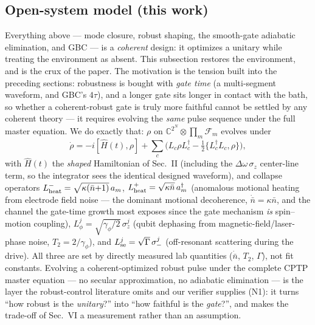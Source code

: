 \documentclass[aps,prapplied,twocolumn,superscriptaddress,floatfix,nofootinbib]{revtex4-2}
\begin{document}
\subsection{Open-system model (this work)}
Everything above --- mode closure, robust shaping, the smooth-gate adiabatic elimination, and GBC
--- is a \emph{coherent} design: it optimizes a unitary while treating the environment as absent. This subsection restores the
environment, and is the crux of the paper. The motivation is the tension built into the
preceding sections: robustness is bought with \emph{gate time} (a multi-segment waveform, and
GBC's $4\tau$), and a longer gate sits longer in contact with the bath, so whether a
coherent-robust gate is truly more faithful cannot be settled by any coherent theory --- it
requires evolving the \emph{same} pulse sequence under the full master equation. We do exactly
that: $\rho$ on $\mathbb C^{2^N}\!\otimes\!\prod_m\mathcal F_m$ evolves under
\begin{equation}
\dot\rho=-i[\hat H(t),\rho]+\sum_c\big(L_c\rho L_c^\dagger-\tfrac12\{L_c^\dagger L_c,\rho\}\big),
\end{equation}
with $\hat H(t)$ the \emph{shaped} Hamiltonian of Sec.~II (including the $\Delta\omega\,\sigma_z$
center-line term, so the integrator sees the identical designed waveform), and collapse operators
$L_{\rm heat}^{-}=\sqrt{\kappa(\bar n{+}1)}\,a_m$, $L_{\rm heat}^{+}=\sqrt{\kappa\bar n}\,a_m^\dagger$
(anomalous motional heating from electrode field noise --- the dominant motional decoherence,
$\dot{\bar n}=\kappa\bar n$, and the channel the gate-time growth most exposes since the gate
mechanism \emph{is} spin--motion coupling), $L_\phi^{j}=\sqrt{\gamma_\phi/2}\,\sigma_z^{j}$ (qubit
dephasing from magnetic-field/laser-phase noise, $T_2{=}2/\gamma_\phi$), and
$L_{\rm se}^{j}=\sqrt{\Gamma}\,\sigma_-^{j}$ (off-resonant scattering during the drive). All three
are set by directly measured lab quantities ($\dot{\bar n}$, $T_2$, $\Gamma$), not fit constants.
Evolving a coherent-optimized robust pulse under the complete CPTP master equation --- no secular
approximation, no adiabatic elimination --- is the layer the robust-control literature omits and
our verifier supplies (N1): it turns ``how robust is the \emph{unitary}?'' into ``how faithful is
the \emph{gate}?'', and makes the trade-off of Sec.~VI a measurement rather than an assumption.
\end{document}
